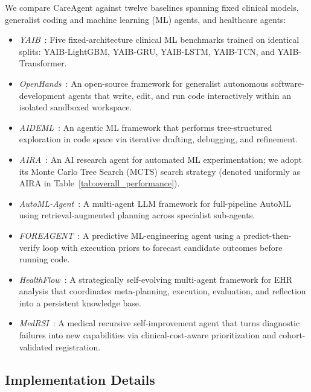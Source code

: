 We compare CareAgent against twelve baselines spanning fixed clinical models, generalist coding and machine learning (ML) agents, and healthcare agents:
\begin{itemize}
    \item \textit{YAIB}~\cite{vandewater2024yaib}: Five fixed-architecture clinical ML benchmarks trained on identical splits: YAIB-LightGBM, YAIB-GRU, YAIB-LSTM, YAIB-TCN, and YAIB-Transformer.
    \item \textit{OpenHands}~\cite{wang2025openhands}: An open-source framework for generalist autonomous software-development agents that write, edit, and run code interactively within an isolated sandboxed workspace.
    \item \textit{AIDEML}~\cite{jiang2025aide}: An agentic ML framework that performs tree-structured exploration in code space via iterative drafting, debugging, and refinement.
    \item \textit{AIRA}~\cite{toledo2025aira}: An AI research agent for automated ML experimentation; we adopt its Monte Carlo Tree Search (MCTS) search strategy (denoted uniformly as AIRA in Table~\ref{tab:overall_performance}).
    \item \textit{AutoML-Agent}~\cite{trirat2025automlagent}: A multi-agent LLM framework for full-pipeline AutoML using retrieval-augmented planning across specialist sub-agents.
    \item \textit{FOREAGENT}~\cite{zheng2026foreagent}: A predictive ML-engineering agent using a predict-then-verify loop with execution priors to forecast candidate outcomes before running code.
    \item \textit{HealthFlow}~\cite{zhu2026healthflow}: A strategically self-evolving multi-agent framework for EHR analysis that coordinates meta-planning, execution, evaluation, and reflection into a persistent knowledge base.
    \item \textit{MedRSI}~\cite{wu2026medrsi}: A medical recursive self-improvement agent that turns diagnostic failures into new capabilities via clinical-cost-aware prioritization and cohort-validated registration.
\end{itemize}

\subsection{Implementation Details}
\label{sec:implementation}


